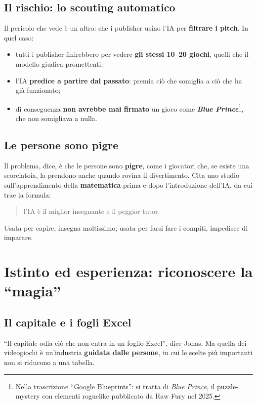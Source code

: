 \subsection{Il rischio: lo scouting automatico}

Il pericolo che vede è un altro: che i publisher usino l'IA per \textbf{filtrare i
pitch}. In quel caso:
\begin{itemize}
  \item tutti i publisher finirebbero per vedere \textbf{gli stessi 10--20 giochi},
        quelli che il modello giudica promettenti;
  \item l'IA \textbf{predice a partire dal passato}: premia ciò che somiglia a ciò
        che ha già funzionato;
  \item di conseguenza \textbf{non avrebbe mai firmato} un gioco come
        \textbf{\emph{Blue Prince}}\footnote{Nella trascrizione ``Google
        Blueprints'': si tratta di \emph{Blue Prince}, il puzzle-mystery con
        elementi roguelike pubblicato da Raw Fury nel 2025.}, che non somigliava
        a nulla.
\end{itemize}

\subsection{Le persone sono pigre}

Il problema, dice, è che le persone sono \textbf{pigre}, come i giocatori che, se
esiste una scorciatoia, la prendono anche quando rovina il divertimento. Cita uno
studio sull'apprendimento della \textbf{matematica} prima e dopo l'introduzione
dell'IA, da cui trae la formula:
\begin{quote}
l'IA è il miglior insegnante e il peggior tutor.
\end{quote}
Usata per capire, insegna moltissimo; usata per farsi fare i compiti, impedisce di
imparare.

\section{Istinto ed esperienza: riconoscere la ``magia''}
\label{sec:c2-5-magia}

\subsection{Il capitale e i fogli Excel}

``Il capitale odia ciò che non entra in un foglio Excel'', dice Jonas. Ma quella
dei videogiochi è un'industria \textbf{guidata dalle persone}, in cui le scelte più
importanti non si riducono a una tabella.

